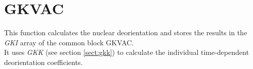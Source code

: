 \section{GKVAC}
\label{sect:gkvac}

\noindent This function calculates the nuclear deorientation and stores the
results in the {\em GKI} array of the common block GKVAC.\\

\noindent It uses {\em GKK} (see section \ref{sect:gkk}) to calculate the
individual time-dependent deorientation coefficients.\\
